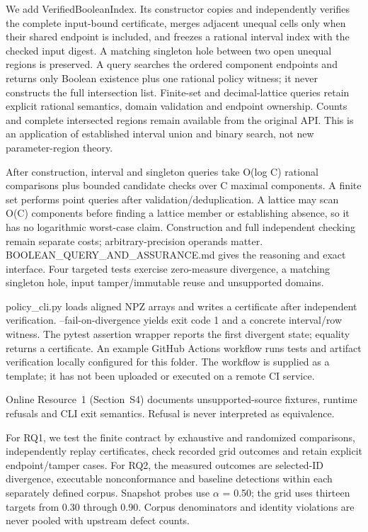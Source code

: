 \documentclass[11pt,a4paper]{article}
\theoremstyle{plain}
\theoremstyle{definition}
\theoremstyle{remark}
\begin{document}
We add VerifiedBooleanIndex. Its constructor copies and independently verifies the complete input-bound certificate, merges adjacent unequal cells only when their shared endpoint is included, and freezes a rational interval index with the checked input digest. A matching singleton hole between two open unequal regions is preserved. A query searches the ordered component endpoints and returns only Boolean existence plus one rational policy witness; it never constructs the full intersection list. Finite-set and decimal-lattice queries retain explicit rational semantics, domain validation and endpoint ownership. Counts and complete intersected regions remain available from the original API. This is an application of established interval union and binary search, not new parameter-region theory.

After construction, interval and singleton queries take O(log C) rational comparisons plus bounded candidate checks over C maximal components. A finite set performs point queries after validation/deduplication. A lattice may scan O(C) components before finding a lattice member or establishing absence, so it has no logarithmic worst-case claim. Construction and full independent checking remain separate costs; arbitrary-precision operands matter. BOOLEAN\_QUERY\_AND\_ASSURANCE.md gives the reasoning and exact interface. Four targeted tests exercise zero-measure divergence, a matching singleton hole, input tamper/immutable reuse and unsupported domains.

policy\_cli.py loads aligned NPZ arrays and writes a certificate after independent verification. --fail-on-divergence yields exit code 1 and a concrete interval/row witness. The pytest assertion wrapper reports the first divergent state; equality returns a certificate. An example GitHub Actions workflow runs tests and artifact verification locally configured for this folder. The workflow is supplied as a template; it has not been uploaded or executed on a remote CI service.

Online Resource~1 (Section~S4) documents unsupported-source fixtures, runtime refusals and CLI exit semantics. Refusal is never interpreted as equivalence.

For RQ1, we test the finite contract by exhaustive and randomized comparisons, independently replay certificates, check recorded grid outcomes and retain explicit endpoint/tamper cases. For RQ2, the measured outcomes are selected-ID divergence, executable nonconformance and baseline detections within each separately defined corpus. Snapshot probes use $\alpha$ = 0.50; the grid uses thirteen targets from 0.30 through 0.90. Corpus denominators and identity violations are never pooled with upstream defect counts.
\end{document}
